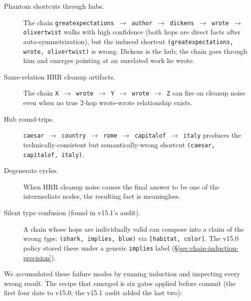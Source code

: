 \documentclass[11pt]{article}
\begin{document}
\begin{description}
\item[Phantom shortcuts through hubs.] The chain
      \texttt{greatexpectations $\rightarrow$ author $\rightarrow$
      dickens $\rightarrow$ wrote $\rightarrow$ olivertwist} walks
      with high confidence (both hops are direct facts after
      auto-symmetrization), but the induced shortcut
      \texttt{(greatexpectations, wrote, olivertwist)} is wrong.
      Dickens is the hub; the chain goes through him and emerges
      pointing at an unrelated work he wrote.
\item[Same-relation HRR cleanup artifacts.] The chain
      \texttt{X $\rightarrow$ wrote $\rightarrow$ Y $\rightarrow$
      wrote $\rightarrow$ Z} can fire on cleanup noise even when no
      true 2-hop wrote-wrote relationship exists.
\item[Hub round-trips.] \texttt{caesar $\rightarrow$ country $\rightarrow$
      rome $\rightarrow$ capitalof $\rightarrow$ italy} produces
      the technically-consistent but semantically-wrong shortcut
      \texttt{(caesar, capitalof, italy)}.
\item[Degenerate cycles.] When HRR cleanup noise causes the final
      answer to be one of the intermediate nodes, the resulting
      fact is meaningless.
\item[Silent type confusion (found in v15.1's audit).] A chain whose
      hops are individually valid can compose into a claim of the
      wrong \emph{type}: \texttt{(shark, implies, blue)} via
      \texttt{[habitat, color]}. The v15.0 policy stored these under
      a generic \texttt{implies} label
      (\S\ref{sec:chain-induction-precision}).
\end{description}

We accumulated these failure modes by running induction and
inspecting every wrong result. The recipe that emerged is six gates
applied before commit (the first four date to v15.0; the v15.1
audit added the last two):
\end{document}
